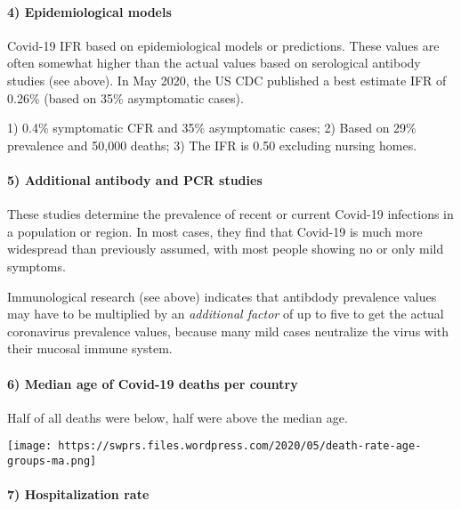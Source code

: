 \hypertarget{4-epidemiological-models}{%
\paragraph{4) Epidemiological models}\label{4-epidemiological-models}}

Covid-19 IFR based on epidemiological models or predictions. These
values are often somewhat higher than the actual values based on
serological antibody studies (see above). In May 2020, the US CDC
published a best estimate IFR of 0.26\% (based on 35\% asymptomatic
cases).

1) 0.4\% symptomatic CFR and 35\% asymptomatic cases; 2) Based on 29\%
prevalence and 50,000 deaths; 3) The IFR is 0.50 excluding nursing
homes.

\hypertarget{5-additional-antibody-and-pcr-studies}{%
\paragraph{5) Additional antibody and PCR
studies}\label{5-additional-antibody-and-pcr-studies}}

These studies determine the prevalence of recent or current Covid-19
infections in a population or region. In most cases, they find that
Covid-19 is much more widespread than previously assumed, with most
people showing no or only mild symptoms.

Immunological research (see above) indicates that antibdody prevalence
values may have to be multiplied by an \emph{additional factor} of up to
five to get the actual coronavirus prevalence values, because many mild
cases neutralize the virus with their mucosal immune system.

\hypertarget{6-median-age-of-covid-19-deaths-per-country}{%
\paragraph{6) Median age of Covid-19 deaths per
country}\label{6-median-age-of-covid-19-deaths-per-country}}

Half of all deaths were below, half were above the median age.

\texttt{[image: https://swprs.files.wordpress.com/2020/05/death-rate-age-groups-ma.png]}

\hypertarget{7-hospitalization-rate}{%
\paragraph{7) Hospitalization rate}\label{7-hospitalization-rate}}

